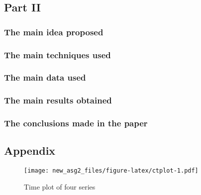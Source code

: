 \documentclass[10pt,]{article}
\begin{document}
\subsection{Part II}\label{part-ii}

\subsubsection{The main idea proposed}\label{the-main-idea-proposed}

\subsubsection{The main techniques used}\label{the-main-techniques-used}

\subsubsection{The main data used}\label{the-main-data-used}

\subsubsection{The main results
obtained}\label{the-main-results-obtained}

\subsubsection{The conclusions made in the
paper}\label{the-conclusions-made-in-the-paper}

\subsection{Appendix}\label{appendix}

\begin{figure}
\centering
\texttt{[image: new\_asg2\_files/figure-latex/ctplot-1.pdf]}
\caption{Time plot of four series}
\end{figure}
\end{document}
